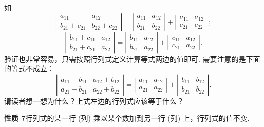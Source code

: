 \documentclass[UTF8, 12pt, fontset=fandol, oneside]{ctexart}
\begin{document}
如
\[
\left|\begin{array}{cc}
a_{11} & a_{12}\\
b_{21}+c_{21} & b_{22}+c_{22}
\end{array}\right|
=
\left|\begin{array}{cc}
a_{11} & a_{12}\\
b_{21} & b_{22}
\end{array}\right|
+
\left|\begin{array}{cc}
a_{11} & a_{12}\\
c_{21} & c_{22}
\end{array}\right|;
\]
\[
\left|\begin{array}{cc}
b_{11}+c_{11} & a_{12}\\
b_{21}+c_{21} & a_{22}
\end{array}\right|
=
\left|\begin{array}{cc}
b_{11} & a_{12}\\
b_{21} & a_{22}
\end{array}\right|
+
\left|\begin{array}{cc}
c_{11} & a_{12}\\
c_{21} & a_{22}
\end{array}\right|.
\]
验证也非常容易，只需按照行列式定义计算等式两边的值即可. 需要注意的是下面的等式不成立：
\[
\left|\begin{array}{cc}
a_{11}+b_{11} & a_{12}+b_{12}\\
a_{21}+b_{21} & a_{22}+b_{22}
\end{array}\right|
=
\left|\begin{array}{cc}
a_{11} & a_{12}\\
a_{21} & a_{22}
\end{array}\right|
+
\left|\begin{array}{cc}
b_{11} & b_{12}\\
b_{21} & b_{22}
\end{array}\right|.
\]
请读者想一想为什么？上式左边的行列式应该等于什么？

\noindent\textbf{性质 7}\quad 行列式的某一行 (列) 乘以某个数加到另一行 (列) 上，行列式的值不变.
\end{document}

